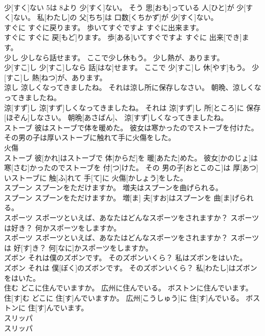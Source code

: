 \documentclass[8pt]{extreport}
\begin{document}
\begin{CJK}{UTF8}{min}
\\	少[すく]ない 5は 8より 少[すく]ない。 そう 思[おも]っている 人[ひと]が 少[すく]ない。 私[わたし]の 父[ちち]は 口数[くちかず]が 少[すく]ない。
\\	すぐに すぐに戻ります。 歩いてすぐですよ すぐに出来ます。	
\\	すぐに すぐに 戻[もど]ります。 歩[ある]いてすぐですよ すぐに 出来[でき]ます。
\\	少し 少しなら話せます。 ここで少し休もう。 少し熱が、あります。	
\\	少[すこ]し 少[すこ]しなら 話[はな]せます。 ここで 少[すこ]し 休[やす]もう。 少[すこ]し 熱[ねつ]が、あります。
\\	涼し 涼しくなってきましたね。 それは涼し所に保存しなさい。 朝晩、涼しくなってきましたね。	
\\	涼[すず]し 涼[すず]しくなってきましたね。 それは 涼[すず]し 所[ところ]に 保存[ほぞん]しなさい。 朝晩[あさばん]、 涼[すず]しくなってきましたね。
\\	ストーブ 彼はストーブで体を暖めた。 彼女は寒かったのでストーブを付けた。 その男の子は厚いストーブに触れて手に火傷をした。	
\\	火傷 
\\	ストーブ 彼[かれ]はストーブで 体[からだ]を 暖[あたた]めた。 彼女[かのじょ]は 寒[さむ]かったのでストーブを 付[つ]けた。 その 男の子[おとこのこ]は 厚[あつ]いストーブに 触[ふ]れて 手[て]に 火傷[かしょう]をした。
\\	スプーン スプーンをただけますか。 増夫はスプーンを曲げられる。	
\\	スプーン スプーンをただけますか。 増[ま] 夫[すお]はスプーンを 曲[ま]げられる。
\\	スポーツ スポーツといえば、あなたはどんなスポーツをされますか？ スポーツは好き？ 何かスポーツをしますか。	
\\	スポーツ スポーツといえば、あなたはどんなスポーツをされますか？ スポーツは 好[す]き？ 何[なに]かスポーツをしますか。
\\	ズボン それは僕のズボンです。 そのズボンいくら？ 私はズボンをはいた。	
\\	ズボン それは 僕[ぼく]のズボンです。 そのズボンいくら？ 私[わたし]はズボンをはいた。
\\	住む どこに住んでいますか。 広州に住んでいる。 ボストンに住んでいます。	
\\	住[す]む どこに 住[す]んでいますか。 広州[こうしゅう]に 住[す]んでいる。 ボストンに 住[す]んでいます。
\\	スリッパ	
\\	スリッパ

\end{CJK}
\end{document}
